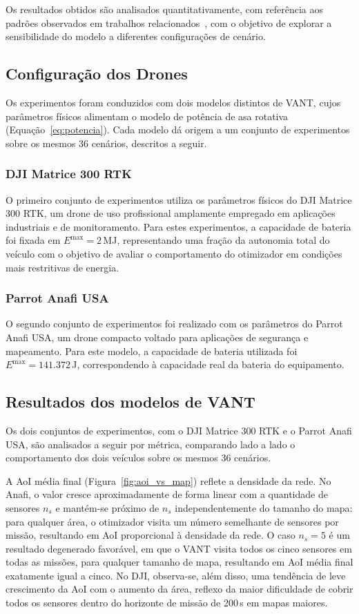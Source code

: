 Os resultados obtidos são analisados quantitativamente, com referência aos padrões observados em trabalhos relacionados~\cite{wei2022survey,messaoudi2023survey}, com o objetivo de explorar a sensibilidade do modelo a diferentes configurações de cenário.

\subsection{Configuração dos Drones}

Os experimentos foram conduzidos com dois modelos distintos de VANT, cujos parâmetros físicos alimentam o modelo de potência de asa rotativa (Equação~\eqref{eq:potencia}). Cada modelo dá origem a um conjunto de experimentos sobre os mesmos 36 cenários, descritos a seguir.

\subsubsection{DJI Matrice 300 RTK}
O primeiro conjunto de experimentos utiliza os parâmetros físicos do DJI Matrice 300 RTK, um drone de uso profissional amplamente empregado em aplicações industriais e de monitoramento. Para estes experimentos, a capacidade de bateria foi fixada em $E^{\max} = 2$\,MJ, representando uma fração da autonomia total do veículo com o objetivo de avaliar o comportamento do otimizador em condições mais restritivas de energia.

\subsubsection{Parrot Anafi USA}
O segundo conjunto de experimentos foi realizado com os parâmetros do Parrot Anafi USA, um drone compacto voltado para aplicações de segurança e mapeamento. Para este modelo, a capacidade de bateria utilizada foi $E^{\max} = 141.372$\,J, correspondendo à capacidade real da bateria do equipamento.

\subsection{Resultados dos modelos de VANT}

Os dois conjuntos de experimentos, com o DJI Matrice 300 RTK e o Parrot Anafi USA, são analisados a seguir por métrica, comparando lado a lado o comportamento dos dois veículos sobre os mesmos 36 cenários.

A AoI média final (Figura~\ref{fig:aoi_vs_map}) reflete a densidade da rede. No Anafi, o valor cresce aproximadamente de forma linear com a quantidade de sensores $n_s$ e mantém-se próximo de $n_s$ independentemente do tamanho do mapa: para qualquer área, o otimizador visita um número semelhante de sensores por missão, resultando em AoI proporcional à densidade da rede. O caso $n_s = 5$ é um resultado degenerado favorável, em que o VANT visita todos os cinco sensores em todas as missões, para qualquer tamanho de mapa, resultando em AoI média final exatamente igual a cinco. No DJI, observa-se, além disso, uma tendência de leve crescimento da AoI com o aumento da área, reflexo da maior dificuldade de cobrir todos os sensores dentro do horizonte de missão de 200\,s em mapas maiores.

